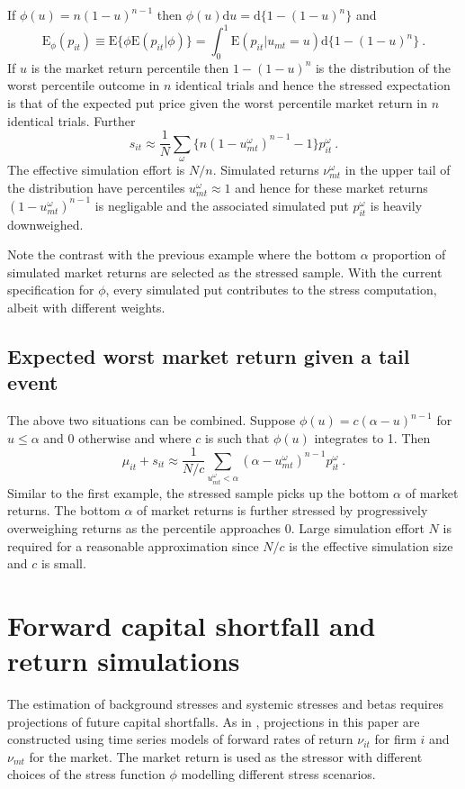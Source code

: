 \documentclass[12pt]{article}
\newcommand{\E}{\mathrm{E}}
\renewcommand{\o}{\omega}
\newcommand{\Es}{\E_\phi}
\newcommand{\de}{\mathrm{d}}
\begin{document}
If $\phi(u)=n(1-u)^{n-1}$ then $\phi(u)\de u = \de\{1-(1-u)^n\}$ and
$$
\Es(p_{it}) \equiv \E\{\phi\E(p_{it}|\phi)\} = \int_0^1\E(p_{it}|u_{mt}=u)\de\{1-(1-u)^n\}\ .
$$
If $u$ is the market return percentile then  $1-(1-u)^n$ is the distribution of the worst percentile outcome in $n$ identical trials and hence the stressed expectation is that of the expected put price given the worst percentile market return in $n$ identical trials.  Further
$$
s_{it}  \approx  \frac{1}{N} \sum_\o \{ n(1-u^\o_{mt})^{n-1}-1\}p_{it}^\o \ .
$$
The effective simulation effort is $N/n$.
Simulated returns $\nu^\o_{mt}$ in the upper tail of the distribution  have percentiles $u^\o_{mt}\approx 1$ and hence for these market returns $(1-u^\o_{mt})^{n-1}$ is negligable and the associated simulated put $p_{it}^\omega$ is heavily downweighed.

Note the contrast with the previous example where the bottom $\alpha$ proportion of simulated market returns are selected as the stressed sample. With the current specification for $\phi$,   every simulated put contributes to the stress computation, albeit with  different weights.


\subsection{Expected worst market return given a tail event}

The above two situations can be combined.   Suppose  $\phi(u)=c(\alpha-u)^{n-1}$ for $u\le \alpha$ and 0 otherwise and where $c$ is such that $\phi(u)$ integrates to 1. Then
$$
\mu_{it}+s_{it} \approx \frac{1}{N/c}\sum_{u^\o_{mt}<\alpha}  \left(\alpha-u^\o_{mt}\right)^{n-1}p_{it}^\o\ .
$$
Similar to the first example, the stressed sample picks up the bottom $\alpha$ of market returns. The bottom $\alpha$ of market returns is further stressed by  progressively overweighing returns as the percentile approaches 0.   Large simulation effort $N$ is required for a reasonable approximation since $N/c$ is the effective simulation size and $c$ is small.


\section{Forward capital shortfall and  return simulations}\label{simulate}

The estimation of background stresses and systemic stresses and betas requires projections of future capital shortfalls. As in \cite{brownlees2015}, projections in this paper are constructed  using time series models of forward rates of return $\nu_{it}$ for firm $i$ and $\nu_{mt}$ for the market. The market return is used as the stressor with different choices of the stress function $\phi$ modelling different stress scenarios.
\end{document}
